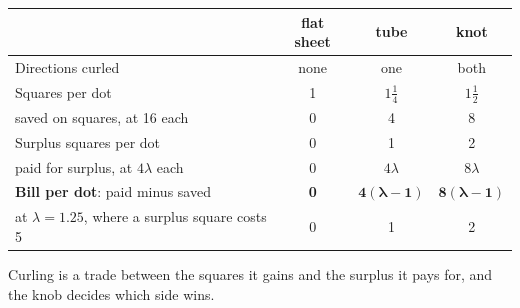 \documentclass[11pt,letterpaper]{article}
\begin{document}
\begin{center}
\renewcommand{\arraystretch}{1.2}
\begin{tabular}{lccc}
\toprule
 & flat sheet & tube & knot \\
\midrule
Directions curled & none & one & both \\
Squares per dot & 1 & $1\tfrac14$ & $1\tfrac12$ \\
\quad saved on squares, at 16 each & 0 & 4 & 8 \\
Surplus squares per dot & 0 & 1 & 2 \\
\quad paid for surplus, at $4\lambda$ each & 0 & $4\lambda$ & $8\lambda$ \\
\midrule
\textbf{Bill per dot}: paid minus saved & \textbf{0} & $\mathbf{4(\lambda - 1)}$ & $\mathbf{8(\lambda - 1)}$ \\
\quad at $\lambda = 1.25$, where a surplus square costs 5 & 0 & 1 & 2 \\
\bottomrule
\end{tabular}
\end{center}

Curling is a trade between the squares it gains and the surplus it pays for, and the knob decides which
side wins.
\end{document}

